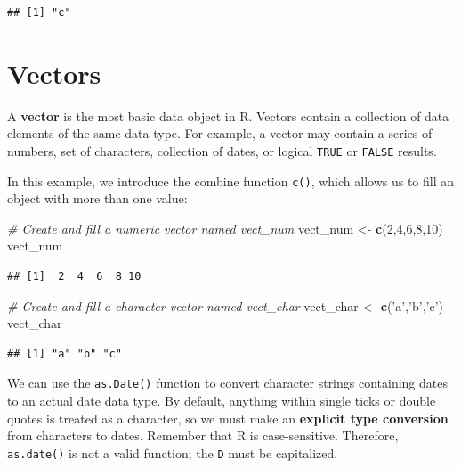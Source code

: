 \documentclass[]{book}
\newenvironment{Shaded}{\begin{snugshade}}{\end{snugshade}}
\newcommand{\CommentTok}[1]{\textcolor[rgb]{0.56,0.35,0.01}{\textit{#1}}}
\newcommand{\DecValTok}[1]{\textcolor[rgb]{0.00,0.00,0.81}{#1}}
\newcommand{\KeywordTok}[1]{\textcolor[rgb]{0.13,0.29,0.53}{\textbf{#1}}}
\newcommand{\NormalTok}[1]{#1}
\newcommand{\StringTok}[1]{\textcolor[rgb]{0.31,0.60,0.02}{#1}}
\begin{document}
\begin{verbatim}
## [1] "c"
\end{verbatim}

\hypertarget{vectors}{%
\section{Vectors}\label{vectors}}

A \textbf{vector} is the most basic data object in R. Vectors contain a collection of data elements of the same data type. For example, a vector may contain a series of numbers, set of characters, collection of dates, or logical \texttt{TRUE} or \texttt{FALSE} results.

In this example, we introduce the combine function \texttt{c()}, which allows us to fill an object with more than one value:

\begin{Shaded}
\begin{Highlighting}[]
\CommentTok{# Create and fill a numeric vector named vect_num}
\NormalTok{vect_num <-}\StringTok{ }\KeywordTok{c}\NormalTok{(}\DecValTok{2}\NormalTok{,}\DecValTok{4}\NormalTok{,}\DecValTok{6}\NormalTok{,}\DecValTok{8}\NormalTok{,}\DecValTok{10}\NormalTok{)}
\NormalTok{vect_num}
\end{Highlighting}
\end{Shaded}

\begin{verbatim}
## [1]  2  4  6  8 10
\end{verbatim}

\begin{Shaded}
\begin{Highlighting}[]
\CommentTok{# Create and fill a character vector named vect_char}
\NormalTok{vect_char <-}\StringTok{ }\KeywordTok{c}\NormalTok{(}\StringTok{'a'}\NormalTok{,}\StringTok{'b'}\NormalTok{,}\StringTok{'c'}\NormalTok{)}
\NormalTok{vect_char}
\end{Highlighting}
\end{Shaded}

\begin{verbatim}
## [1] "a" "b" "c"
\end{verbatim}

We can use the \texttt{as.Date()} function to convert character strings containing dates to an actual date data type. By default, anything within single ticks or double quotes is treated as a character, so we must make an \textbf{explicit type conversion} from characters to dates. Remember that R is case-sensitive. Therefore, \texttt{as.date()} is not a valid function; the \texttt{D} must be capitalized.
\end{document}
